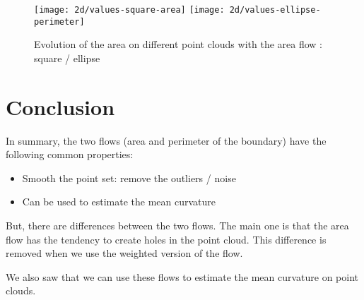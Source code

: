 \begin{figure}[h]
    \centering
    \texttt{[image: 2d/values-square-area]}
    \texttt{[image: 2d/values-ellipse-perimeter]}
    \caption{Evolution of the area on different point clouds with the area
        flow : square / ellipse}
    \label{fig:area_time_decrease}
\end{figure}

\section{Conclusion}

In summary, the two flows (area and perimeter of the boundary) have the
following common properties:
\begin{itemize}
    \item Smooth the point set: remove the outliers / noise
    \item Can be used to estimate the mean curvature
\end{itemize}
But, there are differences between the two flows. The main one is that the area
flow has the tendency to create holes in the point cloud. This difference is
removed when we use the weighted version of the flow.

We also saw that we can use these flows to estimate the mean curvature on point
clouds.

